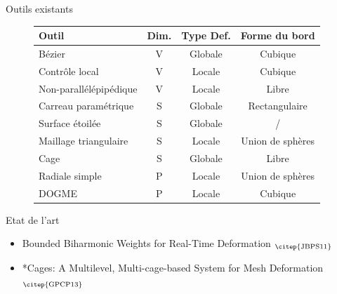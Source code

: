 \documentclass[xcolor=x11names,compress]{beamer}
\renewcommand{\(}{\begin{columns}} \renewcommand{\)}{\end{columns}}
\newcommand{\<}[1]{\begin{column}{#1}} \renewcommand{\>}{\end{column}}
\begin{document}
\begin{frame}{Outils existants}
  \begin{figure}[h]
    \begin{center}
      \begin{tabular}{|l|c|c|c|}
        \hline
        \textbf{Outil} & \textbf{Dim.} & \textbf{Type Def.} & \textbf{Forme du bord} \\
        \hline
        \hline
        Bézier & V & Globale & Cubique\\
        \hline
        Contrôle local & V & Locale & Cubique\\
        \hline
        Non-parallélépipédique & V & Locale & Libre\\
        \hline
        \hline
        Carreau paramétrique & S & Globale & Rectangulaire\\
        \hline
        Surface étoilée & S & Globale & /\\
        \hline
        Maillage triangulaire & S & Locale & Union de sphères\\
        \hline
        Cage & S & Globale & Libre\\
        \hline
        \hline
        Radiale simple & P & Locale & Union de sphères\\
        \hline
        DOGME & P & Locale & Cubique\\
        \hline
      \end{tabular}
      \caption{\citep{GB08}}
    \end{center}
  \end{figure}
\end{frame}

\begin{frame}{Etat de l'art}
  \begin{itemize}
  \item Bounded Biharmonic Weights for Real-Time Deformation
    $_{\text{\citep{JBPS11}}}$
  \item *Cages: A Multilevel, Multi-cage-based System for Mesh
    Deformation $_{\text{\citep{GPCP13}}}$
  \end{itemize}
\end{frame}
\end{document}
